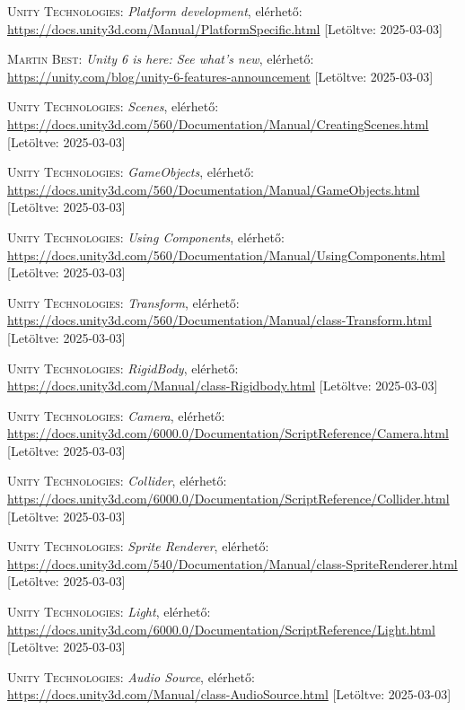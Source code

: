 \documentclass[]{thesis-ekf}
\theoremstyle{definition}
\theoremstyle{remark}
\begin{document}
\begin{thebibliography}{2}
	\textsc{Unity Technologies}: \emph{Platform development}, elérhető:
	\url{https://docs.unity3d.com/Manual/PlatformSpecific.html} [Letöltve: 2025-03-03]
	
	\textsc{Martin Best}: \emph{Unity 6 is here: See what's new}, elérhető:
	\url{https://unity.com/blog/unity-6-features-announcement} [Letöltve: 2025-03-03]
	
	\textsc{Unity Technologies}: \emph{Scenes}, elérhető:
	\url{https://docs.unity3d.com/560/Documentation/Manual/CreatingScenes.html} [Letöltve: 2025-03-03]
	
	\textsc{Unity Technologies}: \emph{GameObjects}, elérhető:
	\url{https://docs.unity3d.com/560/Documentation/Manual/GameObjects.html} [Letöltve: 2025-03-03]
	
	\textsc{Unity Technologies}: \emph{Using Components}, elérhető:
	\url{https://docs.unity3d.com/560/Documentation/Manual/UsingComponents.html} [Letöltve: 2025-03-03]
	
	\textsc{Unity Technologies}: \emph{Transform}, elérhető:
	\url{https://docs.unity3d.com/560/Documentation/Manual/class-Transform.html} [Letöltve: 2025-03-03]
	
	\textsc{Unity Technologies}: \emph{RigidBody}, elérhető:
	\url{https://docs.unity3d.com/Manual/class-Rigidbody.html} [Letöltve: 2025-03-03]
	
	\textsc{Unity Technologies}: \emph{Camera}, elérhető:
	\url{https://docs.unity3d.com/6000.0/Documentation/ScriptReference/Camera.html} [Letöltve: 2025-03-03]
	
	\textsc{Unity Technologies}: \emph{Collider}, elérhető:
	\url{https://docs.unity3d.com/6000.0/Documentation/ScriptReference/Collider.html} [Letöltve: 2025-03-03]
	
	\textsc{Unity Technologies}: \emph{Sprite Renderer}, elérhető:
	\url{https://docs.unity3d.com/540/Documentation/Manual/class-SpriteRenderer.html} [Letöltve: 2025-03-03]
	
	\textsc{Unity Technologies}: \emph{Light}, elérhető:
	\url{https://docs.unity3d.com/6000.0/Documentation/ScriptReference/Light.html} [Letöltve: 2025-03-03]
	
	\textsc{Unity Technologies}: \emph{Audio Source}, elérhető:
	\url{https://docs.unity3d.com/Manual/class-AudioSource.html} [Letöltve: 2025-03-03]
	

\end{thebibliography}
\end{document}
